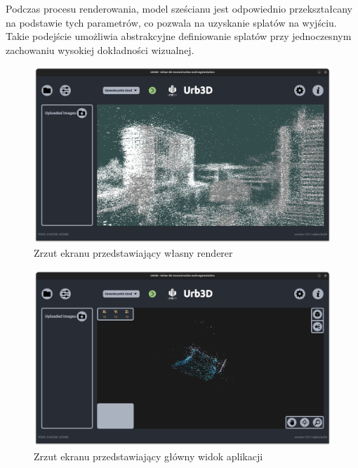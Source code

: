 Podczas procesu renderowania, model sześcianu jest odpowiednio przekształcany na podstawie tych parametrów, co pozwala na uzyskanie splatów na wyjściu. Takie podejście umożliwia abstrakcyjne definiowanie splatów przy jednoczesnym zachowaniu wysokiej dokładności wizualnej.

\clearpage

\begin{figure}[!ht]
    \centering
    \includegraphics[width=\textwidth]{images/cloud_rendering.png}
    \caption{Zrzut ekranu przedstawiający własny renderer}
    \label{fig:rendering}
\end{figure}

\begin{figure}[!ht]
    \centering
    \includegraphics[width=\textwidth]{images/UI-Rendering.png}
    \caption{Zrzut ekranu przedstawiający główny widok aplikacji}
    \label{fig:ui}
\end{figure}